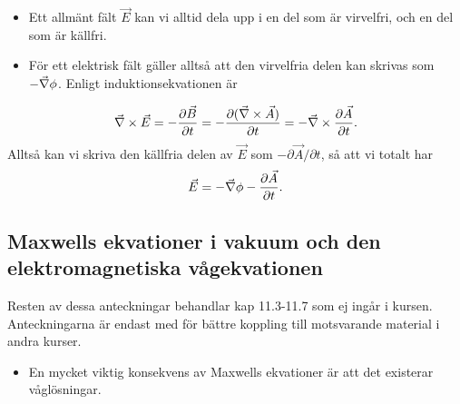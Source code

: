 \documentclass[%
oneside,                 %
final,                   %
10pt]{article}
\newenvironment{warning_mdfboxadmon}[1][]{
\begin{warning_mdfboxmdframed}[frametitle=#1]
}
{
\end{warning_mdfboxmdframed}
}
\begin{document}
\begin{itemize}
\item Ett allmänt fält $\vec{E}$ kan vi alltid dela upp i en del som är virvelfri, och en del som är källfri. 

\item För ett elektrisk fält gäller alltså att den virvelfria delen kan skrivas som $-\vec{\nabla} \phi$.  Enligt induktionsekvationen är
\end{itemize}

\noindent
$$
\vec{\nabla} \times \vec{E} = - \frac{\partial \vec{B}}{\partial t} = -
\frac{\partial (\vec{\nabla} \times \vec{A})}{\partial t} = - \vec{\nabla} \times 
\frac{\partial \vec{A}}{\partial t}.
$$
Alltså kan vi skriva den källfria delen av $\vec{E}$ som
$-\partial \vec{A} / \partial t$, så att vi totalt har
\begin{equation}
  \vec{E} = - \vec{\nabla} \phi - \frac{\partial \vec{A}}{\partial t}.
\end{equation}


\subsection*{Maxwells ekvationer i vakuum och den elektromagnetiska vågekvationen}


\begin{warning_mdfboxadmon}[OBS!]
Resten av dessa anteckningar behandlar kap 11.3-11.7 som ej ingår i kursen. Anteckningarna är endast med för bättre koppling till motsvarande material i andra kurser.
\end{warning_mdfboxadmon} %



\begin{itemize}
\item En mycket viktig konsekvens av Maxwells ekvationer är att det existerar våglösningar.
\end{itemize}
\end{document}
